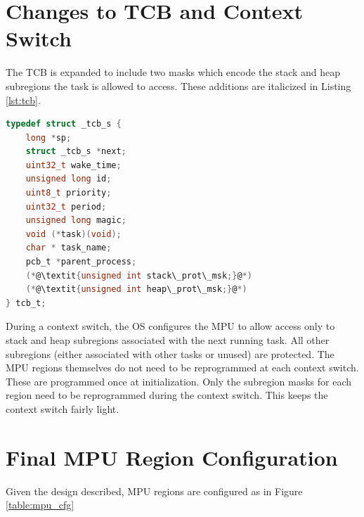 \section{Changes to TCB and Context Switch}

The TCB is expanded to include two masks which encode the stack and heap subregions the task is allowed to access. These additions are italicized in Listing \ref{lst:tcb}.

\begin{lstlisting}[language=c, caption={TCB struct definition}, captionpos=b, label={lst:tcb}]
typedef struct _tcb_s {
    long *sp;
    struct _tcb_s *next;
    uint32_t wake_time;
    unsigned long id;
    uint8_t priority;
    uint32_t period;
    unsigned long magic;
    void (*task)(void);
    char * task_name;
    pcb_t *parent_process;
    (*@\textit{unsigned int stack\_prot\_msk;}@*)
    (*@\textit{unsigned int heap\_prot\_msk;}@*)
} tcb_t;
\end{lstlisting}

During a context switch, the OS configures the MPU to allow access only to stack and heap subregions associated with the next running task. All other subregions (either associated with other tasks or unused) are protected. The MPU regions themselves do not need to be reprogrammed at each context switch. These are programmed once at initialization. Only the subregion masks for each region need to be reprogrammed during the context switch. This keeps the context switch fairly light.

\section{Final MPU Region Configuration}

Given the design described, MPU regions are configured as in Figure \ref{table:mpu_cfg}



